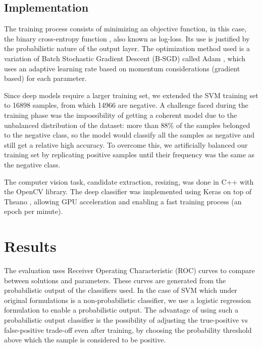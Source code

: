     \subsection{Implementation}
        The training process consists of minimizing an objective function, in this case, the binary cross-entropy function \cite{DLbook}, also known as log-loss. Its use is justified by the probabilistic nature of the output layer. The optimization method used is a variation of Batch Stochastic Gradient Descent (B-SGD) called Adam \cite{kingma2014adam}, which uses an adaptive learning rate based on momentum considerations (gradient based) for each parameter.

        Since deep models require a larger training set, we extended the SVM training set to 16898 samples, from which 14966 are negative. A challenge faced during the training phase was the impossibility of getting a coherent model due to the unbalanced distribution of the dataset: more than 88\% of the samples belonged to the negative class, so the model would classify all the samples as negative and still get a relative high accuracy. To overcome this, we artificially balanced our training set by replicating positive samples until their frequency was the same as the negative class.

        The computer vision task, candidate extraction, resizing, was done in C++ with the OpenCV library. The deep classifier was implemented using Keras \cite{keras} on top of Theano \cite{theano}, allowing GPU acceleration and enabling a fast training process (an epoch per minute).


\section{Results}
\label{sec:results}

    The evaluation uses Receiver Operating Characteristic (ROC) curves \cite{evaluationMetrics} to compare between solutions and parameters. These curves are generated from the probabilistic output of the classifiers used. In the case of SVM which under original formulations is a non-probabilistic classifier, we use a logistic regression formulation \cite{svmProbabilisticOutput} to enable a probabilistic output. The advantage of using such a probabilistic output classifier is the possibility of adjusting the true-positive vs false-positive trade-off even after training, by choosing the probability threshold above which the sample is considered to be positive.

